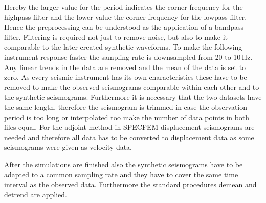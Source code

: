 Hereby the larger value for the period indicates the corner frequency for the highpass filter and the lower value the 
corner frequency for the lowpass filter. Hence the preprocessing can be understood as the application of a bandpass filter. 
Filtering is required not just to remove noise, but also to make it comparable to the later created synthetic waveforms.
To make the following instrument response faster the sampling rate is downsampled from 20 to 10$\,$Hz.
Any linear trends in the data are removed and the mean of the data is set to zero.
%
As every seismic instrument has its own characteristics these have to be removed to make the observed seismograms 
comparable within each other and to the synthetic seismograms.
%
Furthermore it is necessary that the two datasets have the same length, therefore the seismogram is trimmed in case 
the observation period is too long or interpolated too make the number of data points in both files equal. 
For the adjoint method in SPECFEM displacement seismograms are needed and therefore all data has to be converted to 
displacement data as some seismograms were given as velocity data.

After the simulations are finished also the synthetic seismograms have to be adapted to a common sampling rate and 
they have to cover the same time interval as the observed data.
Furthermore the standard procedures demean and detrend are applied.








